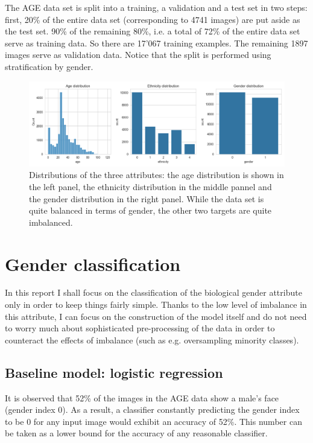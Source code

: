 \documentclass{article}
\begin{document}
The AGE data set is split into a training, a validation and a test set in two steps: first, 20\% of the entire data set (corresponding to 4741 images) are put aside as the test set. 90\% of the remaining 80\%, i.e. a total of 72\% of the entire data set serve as training data. So there are 17'067 training examples. The remaining 1897 images serve as validation data. Notice that the split is performed using stratification by gender.
\begin{figure}[t!]
  \centering
  \includegraphics[width=\textwidth]{imgs/label_distributions.png}
  \caption{Distributions of the three attributes: the age distribution is shown in the left panel, the ethnicity distribution in the middle pannel and the gender distribution in the right panel. While the data set is quite balanced in terms of gender, the other two targets are quite imbalanced.}
  \label{fig:labeldistros}
\end{figure}
\FloatBarrier
\section{Gender classification}
In this report I shall focus on the classification of the biological gender attribute only in order to keep things fairly simple. Thanks to the low level of imbalance in this attribute, I can focus on the construction of the model itself and do not need to worry much about sophisticated pre-processing of the data in order to counteract the effects of imbalance (such as e.g. oversampling minority classes).

\subsection{Baseline model: logistic regression}
It is observed that 52\% of the images in the AGE data show a male's face (gender index 0). As a result, a classifier constantly predicting the gender index to be 0 for any input image would exhibit an accuracy of 52\%. This number can be taken as a lower bound for the accuracy of any reasonable classifier.
\end{document}
